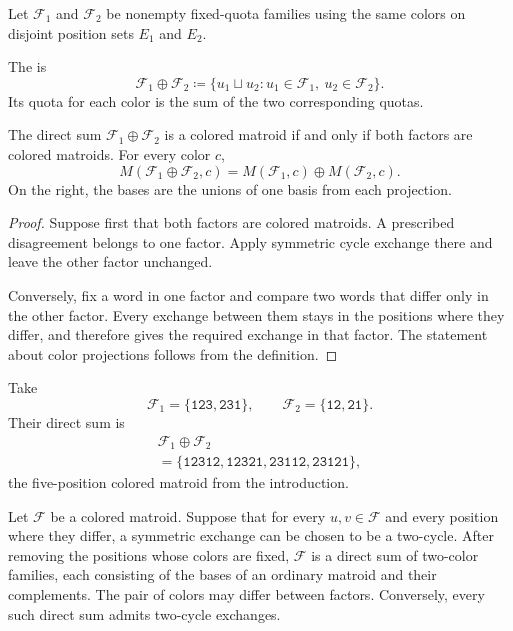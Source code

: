 Let $\mathcal F_1$ and $\mathcal F_2$ be nonempty fixed-quota families using
the same colors on disjoint position sets $E_1$ and $E_2$.

\begin{definition}
The  is
\[
 \mathcal F_1\oplus\mathcal F_2
 \coloneqq
 \{u_1\sqcup u_2:u_1\in\mathcal F_1,\ u_2\in\mathcal F_2\}.
\]
Its quota for each color is the sum of the two corresponding quotas.
\end{definition}

\begin{proposition}
The direct sum $\mathcal F_1\oplus\mathcal F_2$ is a colored matroid if and
only if both factors are colored matroids. For every color $c$,
\[
 M(\mathcal F_1\oplus\mathcal F_2,c)
 =M(\mathcal F_1,c)\oplus M(\mathcal F_2,c).
\]
On the right, the bases are the unions of one basis from each projection.
\end{proposition}

\begin{proof}
Suppose first that both factors are colored matroids. A prescribed
disagreement belongs to one factor. Apply symmetric cycle exchange there and
leave the other factor unchanged.

Conversely, fix a word in one factor and compare two words that differ only
in the other factor. Every exchange between them stays in the positions where
they differ, and therefore gives the required exchange in that factor. The
statement about color projections follows from the definition.
\end{proof}

\begin{example}
Take
\[
 \mathcal F_1=\{\mathtt{123},\mathtt{231}\},
 \qquad
 \mathcal F_2=\{\mathtt{12},\mathtt{21}\}.
\]
Their direct sum is
\[
 \begin{gathered}
 \mathcal F_1\oplus\mathcal F_2\\
 =\{\mathtt{12312},\mathtt{12321},
     \mathtt{23112},\mathtt{23121}\},
 \end{gathered}
\]
the five-position colored matroid from the introduction.
\end{example}

\begin{proposition}
Let $\mathcal F$ be a colored matroid. Suppose that for every
$u,v\in\mathcal F$ and every position where they
differ, a symmetric exchange can be chosen to be a two-cycle. After removing
the positions whose colors are fixed, $\mathcal F$ is a direct sum of
two-color families, each consisting of the bases of an ordinary matroid
and their complements. The pair of colors may differ between factors.
Conversely, every such direct sum admits two-cycle exchanges.
\end{proposition}

